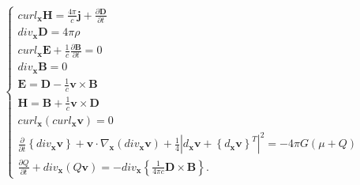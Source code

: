 \documentclass{article}
\theoremstyle{definition}
\theoremstyle{remark}
\renewcommand{\vec}[1]{\mathbf{#1}}
\begin{document}
\begin{equation}\label{guigjgjffghguygjyfghggDD}
\begin{cases}
curl_{\vec x}\vec H=\frac{4\pi}{c}\vec j+\frac{\partial\vec
D}{\partial
t}\\
div_{\vec x}\vec D=4\pi\rho\\
curl_{\vec x}\vec E+\frac{1}{c}\frac{\partial\vec B}{\partial t}=0\\
div_{\vec x}\vec B=0\\
\vec E=\vec D-\frac{1}{c}\vec v\times\vec B\\
\vec H=\vec B+\frac{1}{c}\vec v\times\vec D\\
curl_{\vec x}\left(curl_{\vec x}\vec v\right)=0
\\
\frac{\partial}{\partial t}\left\{div_{\vec x}\vec v\right\}+\vec
v\cdot\nabla_{\vec x}\left(div_{\vec x}\vec
v\right)+\frac{1}{4}\left|d_{\vec x}\vec v+\left\{d_{\vec x}\vec
v\right\}^T\right|^2=-4\pi G(\mu+Q)\\
\frac{\partial Q}{\partial t}+div_{\vec x}\left(Q\vec
v\right)=-div_{\vec x}\left\{\frac{1}{4\pi c}\vec D\times\vec
B\right\}.
\end{cases}
\end{equation}
\end{document}
